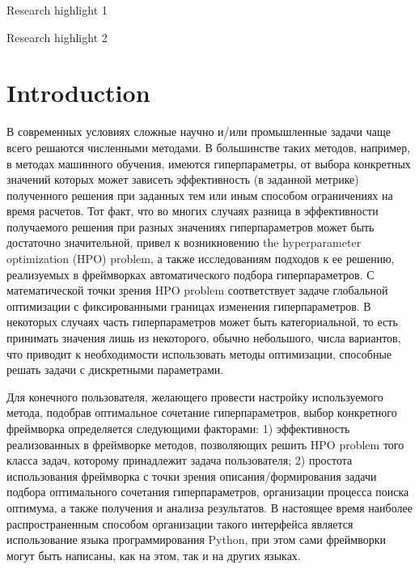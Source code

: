 \documentclass[preprint,12pt]{elsarticle}
\begin{document}
\begin{frontmatter}

\begin{highlights}
\item Research highlight 1
\item Research highlight 2
\end{highlights}

\begin{keyword}



\end{keyword}

\end{frontmatter}

\linenumbers

\section{Introduction}
\label{sec_intro}

В современных условиях сложные научно и/или промышленные задачи чаще всего решаются численными методами. В большинстве таких методов, например, в методах машинного обучения, имеются гиперпараметры, от выбора конкретных значений которых может зависеть эффективность (в заданной метрике) полученного решения при заданных тем или иным способом ограничениях на время расчетов. Тот факт, что во многих случаях разница в эффективности получаемого решения при разных значениях гиперпараметров может быть достаточно значительной, привел к возникновению the hyperparameter optimization (HPO) problem, а также исследованиям подходов к ее решению, реализуемых в фреймворках автоматического подбора гиперпараметров. С математической точки зрения HPO problem соответствует задаче глобальной оптимизации с фиксированными границах изменения гиперпараметров. В некоторых случаях часть гиперпараметров может быть категориальной, то есть принимать значения лишь из некоторого, обычно небольшого, числа вариантов, что приводит к необходимости использовать методы оптимизации, способные решать задачи с дискретными параметрами.

Для конечного пользователя, желающего провести настройку используемого метода, подобрав оптимальное сочетание гиперпараметров, выбор конкретного фреймворка определяется следующими факторами: 1) эффективность реализованных в фреймворке методов, позволяющих решить HPO problem того класса задач, которому принадлежит задача пользователя; 2) простота использования фреймворка с точки зрения описания/формирования задачи подбора оптимального сочетания гиперпараметров, организации процесса поиска оптимума, а также получения и анализа результатов. В настоящее время наиболее распространенным способом организации такого интерфейса является использование языка программирования Python, при этом сами фреймворки могут быть написаны, как на этом, так и на других языках.
\end{document}
